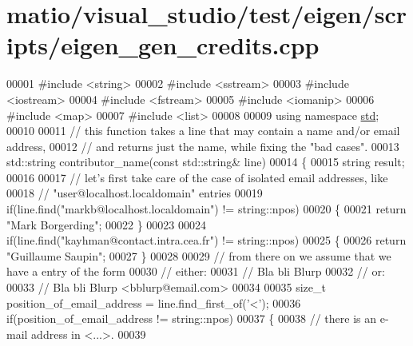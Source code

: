 \hypertarget{matio_2visual__studio_2test_2eigen_2scripts_2eigen__gen__credits_8cpp_source}{}\section{matio/visual\+\_\+studio/test/eigen/scripts/eigen\+\_\+gen\+\_\+credits.cpp}
\label{matio_2visual__studio_2test_2eigen_2scripts_2eigen__gen__credits_8cpp_source}

\begin{DoxyCode}
00001 \textcolor{preprocessor}{#include <string>}
00002 \textcolor{preprocessor}{#include <sstream>}
00003 \textcolor{preprocessor}{#include <iostream>}
00004 \textcolor{preprocessor}{#include <fstream>}
00005 \textcolor{preprocessor}{#include <iomanip>}
00006 \textcolor{preprocessor}{#include <map>}
00007 \textcolor{preprocessor}{#include <list>}
00008 
00009 \textcolor{keyword}{using namespace }\hyperlink{namespacestd}{std};
00010 
00011 \textcolor{comment}{// this function takes a line that may contain a name and/or email address,}
00012 \textcolor{comment}{// and returns just the name, while fixing the "bad cases".}
00013 std::string contributor\_name(\textcolor{keyword}{const} std::string& line)
00014 \{
00015   \textcolor{keywordtype}{string} result;
00016 
00017   \textcolor{comment}{// let's first take care of the case of isolated email addresses, like}
00018   \textcolor{comment}{// "user@localhost.localdomain" entries}
00019   \textcolor{keywordflow}{if}(line.find(\textcolor{stringliteral}{"markb@localhost.localdomain"}) != string::npos)
00020   \{
00021     \textcolor{keywordflow}{return} \textcolor{stringliteral}{"Mark Borgerding"};
00022   \}
00023 
00024   \textcolor{keywordflow}{if}(line.find(\textcolor{stringliteral}{"kayhman@contact.intra.cea.fr"}) != string::npos)
00025   \{
00026     \textcolor{keywordflow}{return} \textcolor{stringliteral}{"Guillaume Saupin"};
00027   \}
00028 
00029   \textcolor{comment}{// from there on we assume that we have a entry of the form}
00030   \textcolor{comment}{// either:}
00031   \textcolor{comment}{//   Bla bli Blurp}
00032   \textcolor{comment}{// or:}
00033   \textcolor{comment}{//   Bla bli Blurp <bblurp@email.com>}
00034   
00035   \textcolor{keywordtype}{size\_t} position\_of\_email\_address = line.find\_first\_of(\textcolor{charliteral}{'<'});
00036   \textcolor{keywordflow}{if}(position\_of\_email\_address != string::npos)
00037   \{
00038     \textcolor{comment}{// there is an e-mail address in <...>.}
00039     

\end{DoxyCode}
